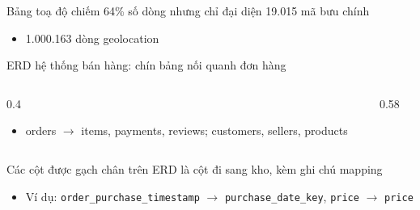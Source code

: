 \begin{frame}{Bảng toạ độ chiếm 64\% số dòng nhưng chỉ đại diện 19.015 mã bưu chính}
\begin{itemize}
  \item 1.000.163 dòng geolocation
\end{itemize}

\end{frame}

\begin{frame}{ERD hệ thống bán hàng: chín bảng nối quanh đơn hàng}
\begin{columns}[T]\begin{column}{0.4\textwidth}
\begin{itemize}
  \item orders $\rightarrow$ items, payments, reviews; customers, sellers, products
\end{itemize}
\end{column}\begin{column}{0.58\textwidth}
\begin{center}\end{center}
\end{column}\end{columns}

\end{frame}

\begin{frame}{Các cột được gạch chân trên ERD là cột đi sang kho, kèm ghi chú mapping}
\begin{itemize}
  \item Ví dụ: \texttt{order\_\allowbreak{}purchase\_\allowbreak{}timestamp} $\rightarrow$ \texttt{purchase\_\allowbreak{}date\_\allowbreak{}key}, \texttt{price} $\rightarrow$ \texttt{price}
\end{itemize}

\end{frame}

